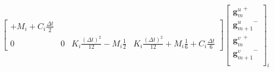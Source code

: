 \documentclass[12pt,a4paper]{report}
\begin{document}
\begin{equation}
\begin{array}{c}
\begin{bmatrix}
		   		+M_i 
			   	+C_i \frac{\Delta t}{2}
		\\    
		   		0  &  0  &  K_i \frac{(\Delta t)^2}{12}
		   						-M_i \frac{1}{2} 
		   	&
		   		K_i \frac{(\Delta t)^2}{12}
		   		+M_i \frac{1}{6} 
			   +C_i \frac{\Delta t}{6} 
	\end{bmatrix}
		\begin{bmatrix}
		  {\mathbf{g}^u_m}^+ 		\\
		  {\mathbf{g}^u_{m+1}}^-  	\\
		  {\mathbf{g}^v_m}^+ 		\\
		  {\mathbf{g}^v_{m+1}}^- 	\\
		\end{bmatrix}_i
\end{array}
\end{equation}
\end{document}
